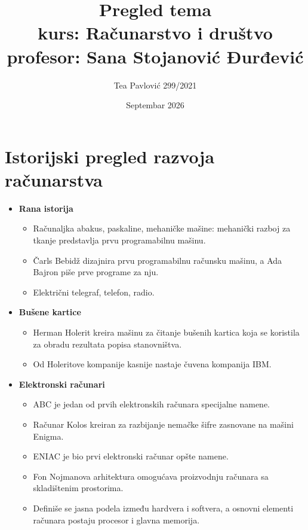 \documentclass{article}
\title{Pregled tema \\[0.3cm] \large kurs: Računarstvo i društvo \\[0.3cm] \large profesor: Sana Stojanović Đurđević}
\author{Tea Pavlović 299/2021}
\date{Septembar 2026}
\begin{document}
\maketitle

\newpage

\tableofcontents

\newpage

\section{Istorijski pregled razvoja računarstva}

\begin{itemize}
    \item \textbf{Rana istorija}
        \begin{itemize}[label=-]
                \item Računaljka abakus, paskaline, mehaničke mašine: mehanički razboj za tkanje predstavlja prvu programabilnu mašinu.
                \item Čarls Bebidž dizajnira prvu programabilnu računsku mašinu, a Ada Bajron piše prve programe za nju.
                \item Električni telegraf, telefon, radio.
            \end{itemize}
    \item \textbf{Bušene kartice}
        \begin{itemize}[label=-]
            \item Herman Holerit kreira mašinu za čitanje bušenih kartica koja se koristila za obradu rezultata popisa stanovništva.
            \item Od Holeritove kompanije kasnije nastaje čuvena kompanija IBM.
        \end{itemize}
    \item \textbf{Elektronski računari}
        \begin{itemize}[label=-]
            \item ABC je jedan od prvih elektronskih računara specijalne namene.
            \item Računar Kolos kreiran za razbijanje nemačke šifre zasnovane na mašini Enigma.
            \item ENIAC je bio prvi elektronski računar opšte namene.
            \item Fon Nojmanova arhitektura omogućava proizvodnju računara sa skladištenim prostorima.
            \item Definiše se jasna podela između hardvera i softvera, a osnovni elementi računara postaju procesor i glavna memorija.

\end{itemize}
\end{itemize}
\end{document}

